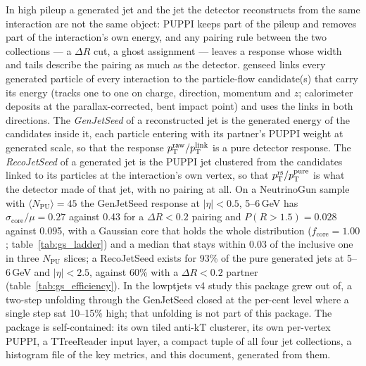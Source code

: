 In high pileup a generated jet and the jet the detector reconstructs from the
same interaction are not the same object: PUPPI keeps part of the pileup and
removes part of the interaction's own energy, and any pairing rule between the
two collections --- a $\Delta R$ cut, a ghost assignment --- leaves a response
whose width and tails describe the pairing as much as the detector. genseed
links every generated particle of every interaction to the particle-flow
candidate(s) that carry its energy (tracks one to one on charge, direction,
momentum and $z$; calorimeter deposits at the parallax-corrected, bent impact
point) and uses the links in both directions. The \emph{GenJetSeed} of a
reconstructed jet is the generated energy of the candidates inside it, each
particle entering with its partner's PUPPI weight at generated scale, so that
the response $p_{\mathrm{T}}^{\mathrm{raw}}/p_{\mathrm{T}}^{\mathrm{link}}$ is a pure detector response. The
\emph{RecoJetSeed} of a generated jet is the PUPPI jet clustered from the
candidates linked to its particles at the interaction's own vertex, so that
$p_{\mathrm{T}}^{\mathrm{rs}}/p_{\mathrm{T}}^{\mathrm{pure}}$ is what the detector made of that jet, with no pairing at all.
On a NeutrinoGun sample with $\langle N_{\mathrm{PU}}\rangle = 45$ the
GenJetSeed response at $|\eta|<0.5$, 5--6\,GeV has
$\sigma_{\mathrm{core}}/\mu = 0.27$ against 0.43 for a $\Delta R<0.2$ pairing
and $P(R>1.5) = 0.028$ against 0.095, with a Gaussian core that holds the
whole distribution ($f_{\mathrm{core}} = 1.00$; table~\ref{tab:gs_ladder}) and
a median that stays within 0.03 of the inclusive one in three
$N_{\mathrm{PU}}$ slices; a RecoJetSeed exists for 93\% of the pure generated
jets at 5--6\,GeV and $|\eta|<2.5$, against 60\% with a $\Delta R<0.2$
partner (table~\ref{tab:gs_efficiency}). In the lowptjets v4 study this package grew out of,
a two-step unfolding through the GenJetSeed closed at the per-cent level where
a single step sat 10--15\% high; that unfolding is not part of this package.
The package is self-contained: its own tiled
anti-kT clusterer, its own per-vertex PUPPI, a TTreeReader input layer, a
compact tuple of all four jet collections, a histogram file of the key
metrics, and this document, generated from them.
